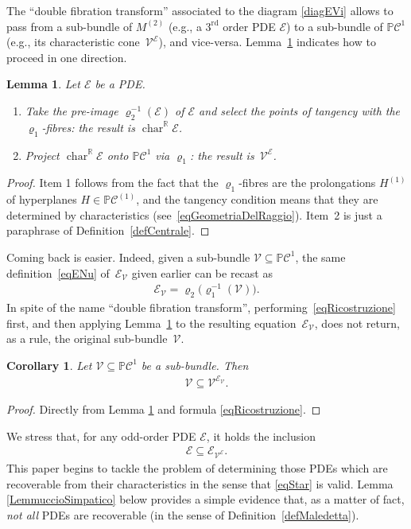 \documentclass[pdftex]{sigma}
\newcommand{\R}{\mathbb{R}}
\newcommand{\C}{\mathcal{C}}
\newcommand{\M}{\mathcal{V}}
\newcommand{\E}{\mathcal{E}}
\newcommand{\V}{{\mathcal{V}}}
\renewcommand{\P}{\mathbb{P}}
\newcommand{\Char}[1]{\operatorname{char}^\R_{#1}}
\newcommand{\Rd}{^\textrm{rd}}
\newcommand{\p}{\varrho}
\numberwithin{equation}{section}
\newtheorem{Corollary}[Theorem]{Corollary}
\newtheorem{Lemma}[Theorem]{Lemma}
\begin{document}
The ``double f\/ibration transform'' associated to the diagram \eqref{diagEVi} allows to pass from a sub-bundle of $M^{(2)}$ (e.g., a $3\Rd$ order PDE $\E$) to a sub-bundle of $\P\C^1$ (e.g., its characteristic cone~$\M^\E$), and vice-versa. Lemma~\ref{lemFlagCharCone} indicates how to proceed in one direction.

\begin{Lemma}\label{lemFlagCharCone}
Let $\E$ be a PDE.
\begin{enumerate}\itemsep=0pt
\item[$1.$] Take the pre-image $\p_2^{-1}(\E)$ of $\E$ and select the points of tangency with the $\p_1$-fibres: the result is $\Char{}{\E}$.
\item[$2.$] Project $\Char{}{\E}$ onto $\P\C^1$ via $\p_1$: the result is~$\M^\E$.
\end{enumerate}
\end{Lemma}

\begin{proof}
 Item 1 follows from the fact that the $\p_1$-f\/ibres are the prolongations $H^{(1)}$ of hyperplanes $H\in\P\C^{(1)}$, and the tangency condition means that they are determined by characteristics (see~\eqref{eqGeometriaDelRaggio}). Item~2 is just a paraphrase of Def\/inition~\ref{defCentrale}.
\end{proof}
Coming back is easier. Indeed, given a sub-bundle $\M\subseteq\P\C^1$, the same def\/inition~\eqref{eqENu} of~$\E_\M$ given earlier can be recast as
 \begin{gather}\label{eqRicostruzione}
\E_\M=\p_2\big(\p_1^{-1}(\M)\big).
\end{gather}
In spite of the name ``double f\/ibration transform'', performing~\eqref{eqRicostruzione} f\/irst, and then applying Lemma~\ref{lemFlagCharCone} to the resulting equation~$\E_\M$, does not return, as a rule, the original sub-bundle~$\V$.
\begin{Corollary}\label{ColloarioCheServiraPrimaOPoi}
 Let $\M\subseteq\P\C^1$ be a sub-bundle. Then
\begin{gather}\label{eq.cuore}
\M\subseteq\M^{\E_\M}.
\end{gather}
\end{Corollary}
\begin{proof}
 Directly from Lemma \ref{lemFlagCharCone} and formula \eqref{eqRicostruzione}.
\end{proof}

We stress that, for any odd-order PDE $\E$, it holds the inclusion
\begin{gather}
\E\subseteq \E_{\M^\E}.\label{eqcuoricino}
\end{gather}
This paper begins to tackle the problem of determining those PDEs which are recoverable from their characteristics in the sense that \eqref{eqStar} is valid. Lemma \ref{LemmuccioSimpatico} below provides a simple evidence that, as a matter of fact, \emph{not all} PDEs are {recoverable} (in the sense of Def\/inition~\ref{defMaledetta}).
\end{document}
